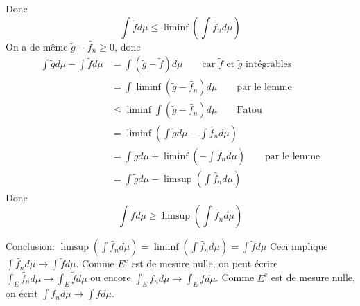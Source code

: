 \documentclass{report}
\begin{document}
Donc $$ \int \widetilde{f} d\mu \leq \liminf \left( \int  \widetilde{f_n} d\mu\right)$$\newline
On a de même $\widetilde{g}-\widetilde{f_n}\geq 0$, donc 
$$\begin{aligned} \int \widetilde{g} d\mu - \int \widetilde{f} d\mu  
&=  \int \left(\widetilde{g} -  \widetilde{f}\right) d\mu \quad \quad \text{car $\widetilde{f}$ et $\widetilde{g}$ intégrables}\\
&= \int \liminf \left(\widetilde{g} - \widetilde{f_n} \right) d\mu \quad \quad \text{par le lemme}\\
&\leq \liminf  \int \left(\widetilde{g} - \widetilde{f_n} \right) d\mu  \quad \quad \text{Fatou }\\
&= \liminf\left(  \int \widetilde{g} d\mu  - \int \widetilde{f_n} d\mu \right) \\
&=  \int \widetilde{g} d\mu   + \liminf\left( -\int \widetilde{f_n} d\mu\right) \quad \quad \text{par le lemme}\\
&=  \int \widetilde{g} d\mu   - \limsup\left( \int \widetilde{f_n} d\mu\right)
\end{aligned}$$\newline
Donc $$ \int \widetilde{f} d\mu \geq \limsup \left( \int  \widetilde{f_n} d\mu\right)$$\newline

Conclusion: $\limsup \left( \int  \widetilde{f_n} d\mu\right) = \liminf \left( \int  \widetilde{f_n} d\mu\right) = \int \widetilde{f} d\mu$ \newline
Ceci implique $\int \widetilde{f_n} d\mu \to \int \widetilde{f} d\mu$. Comme $E^c$ est de mesure nulle, on peut écrire $\int_E \widetilde{f_n} d\mu \to \int_E \widetilde{f} d\mu$ ou encore $\int_E f_n d\mu \to \int_E f d\mu$. Comme $E^c$ est de mesure nulle, on écrit $\int f_n d\mu \to \int f d\mu$.
\end{document}
